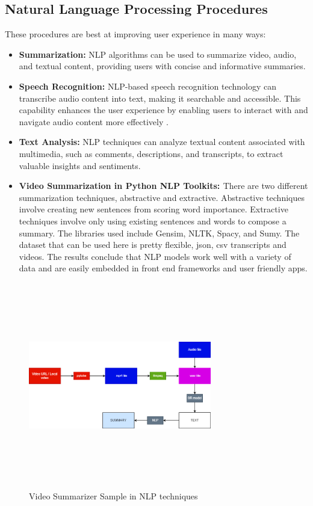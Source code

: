 \documentclass{ieeeaccess}
\begin{document}
\subsection{Natural Language Processing Procedures} 
These procedures are best at improving user experience in many ways:
\begin{itemize}
     \item \textbf{Summarization: } NLP algorithms can be used to summarize video, audio, and textual content, providing users with concise and informative summaries.
    
     \item \textbf{Speech Recognition: } NLP-based speech recognition technology can transcribe audio content into text, making it searchable and accessible. This capability enhances the user experience by enabling users to interact with and navigate audio content more effectively .
    
     \item \textbf{Text Analysis: } NLP techniques can analyze textual content associated with multimedia, such as comments, descriptions, and transcripts, to extract valuable insights and sentiments.
    
     \item \textbf{Video Summarization in Python NLP Toolkits: \cite{IBM-Watson} }
     There are two different summarization techniques, abstractive and extractive. Abstractive techniques involve creating new sentences from scoring word importance. Extractive techniques involve only using existing sentences and words to compose a summary. The libraries used include Gensim, NLTK, Spacy, and Sumy. The dataset that can be used here is pretty flexible, json, csv transcripts and videos. The results conclude that NLP models work well with a variety of data and are easily embedded in front end frameworks and user friendly apps\cite{ML2}\cite{NLP2}.
\end{itemize}

\begin{figure}	[!htb]
\centering
\includegraphics[width=8cm, height=9cm, keepaspectratio]{images/NLP_Arch.png}
\caption{Video Summarizer Sample in NLP techniques}
\label{video_summarizer_example}
\end{figure}
\end{document}
